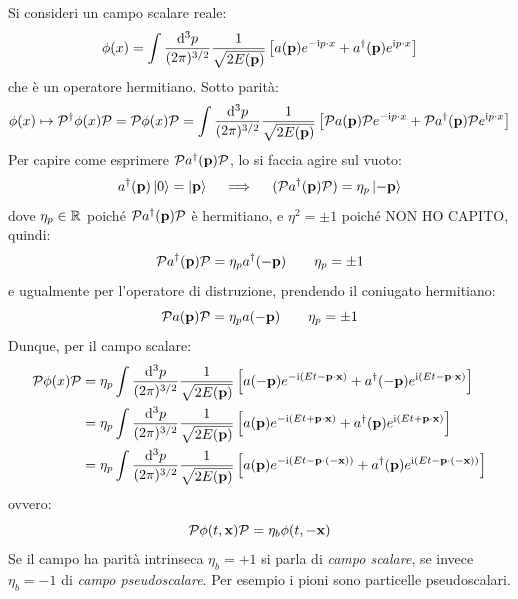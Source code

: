 Si consideri un campo scalare reale:
\begin{equation*}
  \phi(x) = \int \frac{\mathrm{d}^3p}{(2\pi)^{3/2}} \frac{1}{\sqrt{2E(\mathbf{p})}} \left[ a(\mathbf{p}) e^{-\mathrm{i} p \cdot x} + a^\dagger(\mathbf{p}) e^{\mathrm{i} p \cdot x} \right]
\end{equation*}
che è un operatore hermitiano. Sotto parità:
\begin{equation*}
  \phi(x) \mapsto \mathcal{P}^\dagger \phi(x) \mathcal{P} = \mathcal{P} \phi(x) \mathcal{P} = \int \frac{\mathrm{d}^3p}{(2\pi)^{3/2}} \frac{1}{\sqrt{2E(\mathbf{p})}} \left[ \mathcal{P} a(\mathbf{p}) \mathcal{P} e^{-\mathrm{i} p \cdot x} + \mathcal{P} a^\dagger(\mathbf{p}) \mathcal{P} e^{\mathrm{i} p \cdot x} \right]
\end{equation*}
Per capire come esprimere $ \mathcal{P} a^\dagger(\mathbf{p}) \mathcal{P} $, lo si faccia agire sul vuoto:
\begin{equation*}
  a^\dagger(\mathbf{p}) \ket{0} = \ket{\mathbf{p}}
  \quad \implies \quad
  (\mathcal{P} a^\dagger(\mathbf{p}) \mathcal{P}) = \eta_p \ket{-\mathbf{p}}
\end{equation*}
dove $ \eta_p \in \mathbb{R} $ poiché $ \mathcal{P} a^\dagger(\mathbf{p}) \mathcal{P} $ è hermitiano, e $ \eta^2 = \pm 1 $ poiché NON HO CAPITO, quindi:
\begin{equation}
  \mathcal{P} a^\dagger(\mathbf{p}) \mathcal{P} = \eta_p a^\dagger(-\mathbf{p})
  \qquad
  \eta_p = \pm 1
  \label{eq:ad}
\end{equation}
e ugualmente per l'operatore di distruzione, prendendo il coniugato hermitiano:
\begin{equation}
  \mathcal{P} a(\mathbf{p}) \mathcal{P} = \eta_p a(-\mathbf{p})
  \qquad
  \eta_p = \pm 1
  \label{eq:a}
\end{equation}
Dunque, per il campo scalare:
\begin{equation}
  \begin{split}
    \mathcal{P} \phi(x) \mathcal{P}
    & = \eta_p \int \frac{\mathrm{d}^3p}{(2\pi)^{3/2}} \frac{1}{\sqrt{2E(\mathbf{p})}} \left[ a(-\mathbf{p}) e^{-\mathrm{i} (E t - \mathbf{p} \cdot \mathbf{x})} + a^\dagger(-\mathbf{p}) e^{\mathrm{i} (E t - \mathbf{p} \cdot \mathbf{x})} \right] \\
    & = \eta_p \int \frac{\mathrm{d}^3p}{(2\pi)^{3/2}} \frac{1}{\sqrt{2E(\mathbf{p})}} \left[ a(\mathbf{p}) e^{-\mathrm{i} (E t + \mathbf{p} \cdot \mathbf{x})} + a^\dagger(\mathbf{p}) e^{\mathrm{i} (E t + \mathbf{p} \cdot \mathbf{x})} \right] \\
    & = \eta_p \int \frac{\mathrm{d}^3p}{(2\pi)^{3/2}} \frac{1}{\sqrt{2E(\mathbf{p})}} \left[ a(\mathbf{p}) e^{-\mathrm{i} (E t - \mathbf{p} \cdot (-\mathbf{x}))} + a^\dagger(\mathbf{p}) e^{\mathrm{i} (E t - \mathbf{p} \cdot (-\mathbf{x}))} \right] \\
  \end{split}
\end{equation}
ovvero:
\begin{equation}
  \mathcal{P} \phi(t,\mathbf{x}) \mathcal{P} = \eta_b \phi(t,-\mathbf{x})
\end{equation}
Se il campo ha parità intrinseca $ \eta_b = +1 $ si parla di \emph{campo scalare}, se invece $ \eta_b = -1 $ di \emph{campo pseudoscalare}. Per esempio i pioni sono particelle pseudoscalari.

